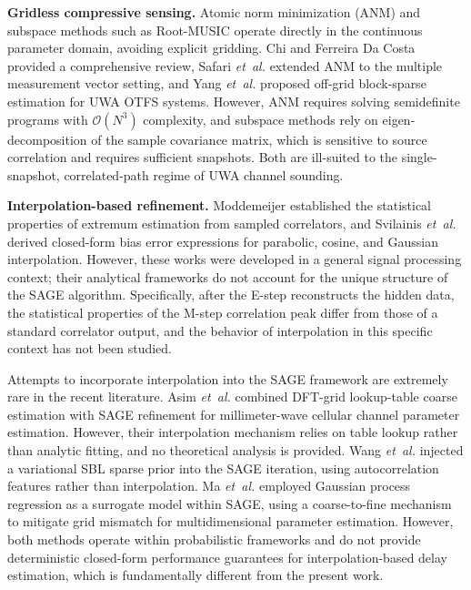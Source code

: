 \documentclass[a4paper,fleqn]{cas-dc}
\newcommand{\bigO}{\mathcal{O}}
\begin{document}
\textbf{Gridless compressive sensing.} Atomic norm minimization (ANM) \cite{tang2013,chi2020} and subspace methods such as Root-MUSIC \cite{schmidt1986} operate directly in the continuous parameter domain, avoiding explicit gridding. Chi and Ferreira Da Costa \cite{chi2020} provided a comprehensive review, Safari \textit{et~al.} \cite{WOS:000662912900031} extended ANM to the multiple measurement vector setting, and Yang \textit{et~al.} \cite{yangUnderwaterAcousticOTFS2026} proposed off-grid block-sparse estimation for UWA OTFS systems. However, ANM requires solving semidefinite programs with $\bigO(N^3)$ complexity, and subspace methods rely on eigen-decomposition of the sample covariance matrix, which is sensitive to source correlation and requires sufficient snapshots. Both are ill-suited to the single-snapshot, correlated-path regime of UWA channel sounding.

\textbf{Interpolation-based refinement.} Moddemeijer \cite{moddemeijer1991} established the statistical properties of extremum estimation from sampled correlators, and Svilainis \textit{et~al.} \cite{WOS:000326270400020} derived closed-form bias error expressions for parabolic, cosine, and Gaussian interpolation. However, these works were developed in a general signal processing context; their analytical frameworks do not account for the unique structure of the SAGE algorithm. Specifically, after the E-step reconstructs the hidden data, the statistical properties of the M-step correlation peak differ from those of a standard correlator output, and the behavior of interpolation in this specific context has not been studied.

Attempts to incorporate interpolation into the SAGE framework are extremely rare in the recent literature. Asim \textit{et~al.} \cite{asimChannelParameterEstimation2020} combined DFT-grid lookup-table coarse estimation with SAGE refinement for millimeter-wave cellular channel parameter estimation. However, their interpolation mechanism relies on table lookup rather than analytic fitting, and no theoretical analysis is provided. Wang \textit{et~al.} \cite{wangJointEstimationMultipath2026} injected a variational SBL sparse prior into the SAGE iteration, using autocorrelation features rather than interpolation. Ma \textit{et~al.} \cite{maEfficientMultidimensionalParameter2025} employed Gaussian process regression as a surrogate model within SAGE, using a coarse-to-fine mechanism to mitigate grid mismatch for multidimensional parameter estimation. However, both methods operate within probabilistic frameworks and do not provide deterministic closed-form performance guarantees for interpolation-based delay estimation, which is fundamentally different from the present work.
\end{document}
